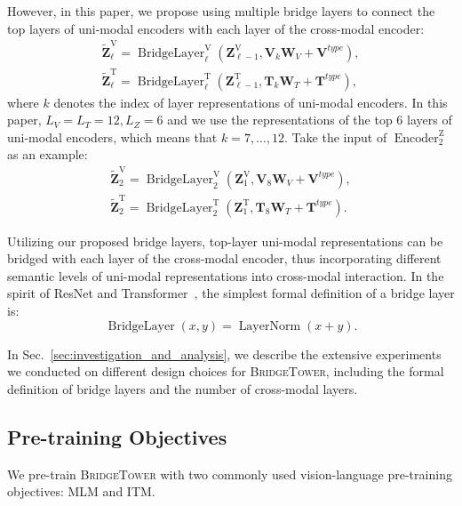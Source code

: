 \documentclass[letterpaper]{article} %
\newcommand{\methodname}[0]{\textsc{BridgeTower}}
\begin{document}
However, in this paper, we propose using multiple bridge layers to connect the top layers of uni-modal encoders with each layer of the cross-modal encoder: 
\begin{gather}
    \tilde{\mathbf{Z}}^\mathrm{V}_{\ell} = \operatorname{BridgeLayer}^\mathrm{V}_\ell(\mathbf{Z}^\mathrm{V}_{\ell-1}, \mathbf{V}_{k}\mathbf{W}_V + \mathbf{V}^{type}), \\
    \tilde{\mathbf{Z}}^\mathrm{T}_{\ell} = \operatorname{BridgeLayer}^\mathrm{T}_\ell(\mathbf{Z}^\mathrm{T}_{\ell-1}, \mathbf{T}_{k}\mathbf{W}_T + \mathbf{T}^{type}),
\end{gather}
where $k$ denotes the index of layer representations of uni-modal encoders. 
In this paper, $L_V=L_T=12, L_Z=6$ and we use the representations of the top $6$ layers of uni-modal encoders, which means that $k=7,\dots,12$. Take the input of $\operatorname{Encoder}^\mathrm{Z}_2$ as an example:
\begin{gather}
    \tilde{\mathbf{Z}}^\mathrm{V}_{2} = \operatorname{BridgeLayer}^\mathrm{V}_{2}(\mathbf{Z}^\mathrm{V}_{1}, \mathbf{V}_{8}\mathbf{W}_V + \mathbf{V}^{type}), \\
    \tilde{\mathbf{Z}}^\mathrm{T}_{2} = \operatorname{BridgeLayer}^\mathrm{T}_{2}(\mathbf{Z}^\mathrm{T}_{1}, \mathbf{T}_{8}\mathbf{W}_T + \mathbf{T}^{type}).
\end{gather}

Utilizing our proposed bridge layers, top-layer uni-modal representations can be bridged with each layer of the cross-modal encoder, thus incorporating different semantic levels of uni-modal representations into cross-modal interaction.
In the spirit of ResNet and Transformer~\citep{vaswani2017attention}, the simplest formal definition of a bridge layer is:
\begin{equation}
    \operatorname{BridgeLayer}(x, y) = \operatorname{LayerNorm}(x + y).
\end{equation}

In Sec.~\ref{sec:investigation_and_analysis}, we describe the extensive experiments we conducted on different design choices for \methodname{}, including the formal definition of bridge layers and the number of cross-modal layers.

\subsection{Pre-training Objectives}
We pre-train \methodname{} with two commonly used vision-language pre-training objectives: MLM and ITM.
\end{document}
